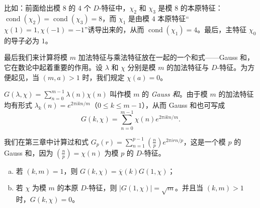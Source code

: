 比如：前面给出模 $8$ 的 $4$ 个 $D$-特征中，$\chi_2$ 和 $\chi_3$ 是模 $8$ 的本原特征：$\operatorname{cond}(\chi_2)=\operatorname{cond}(\chi_3)=8$，而 $\chi_1$ 是由模 $4$ 本原特征``$\chi(1)=1,\chi(-1)=-1$''诱导出来的，从而 $\operatorname{cond}(\chi_1)=4$。最后，主特征 $\chi_0$ 的导子必为 $1$。

最后我们来计算将模 $m$ 加法特征与乘法特征放在一起的一个和式——Gauss 和，它在数论中起着重要的作用。设 $\lambda$ 和 $\chi$ 分别是模 $m$ 的加法特征与 $D$-特征。为方便起见，当 $(m,a)>1$ 时，我们规定 $\chi(a)=0$。

\begin{definition}\label{def:ch4-6}
$G(\lambda,\chi)=\sum_{n=0}^{m-1}\lambda(n)\chi(n)$ 叫作模 $m$ 的 \emph{Gauss 和}。由于模 $m$ 的加法特征均有形式 $\lambda_k(n)=e^{2\pi ikn/m}$（$0\leqslant k\leqslant m-1$），从而 Gauss 和也可写成
\[
  G(k,\chi)=\sum_{n=0}^{m-1}\chi(n)e^{2\pi ikn/m}.
\]
\end{definition}

\begin{remark}
我们在第三章中计算过和式 $G_p(r)=\sum_{n=1}^{p-1}\left(\frac{n}{p}\right)e^{2\pi irn/p}$，这是一个模 $p$ 的 Gauss 和，因为 $\left(\frac{n}{p}\right)=\chi(n)$ 为模 $p$ 的 $D$-特征。
\end{remark}

\begin{theorem}\label{thm:4.7}
\begin{enumerate}[(a)]
  \item 若 $(k,m)=1$，则 $G(k,\chi)=\overline{\chi}(k)G(1,\chi)$；
  \item 若 $\chi$ 为模 $m$ 的本原 $D$-特征，则 $|G(1,\chi)|=\sqrt{m}$。并且当 $(k,m)>1$ 时，$G(k,\chi)=0$。
\end{enumerate}
\end{theorem}

